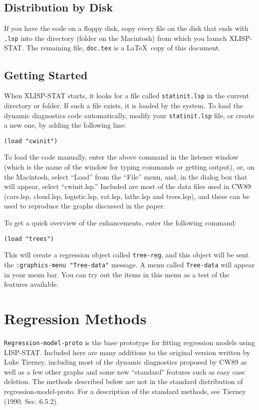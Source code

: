 \subsection{Distribution by Disk}
If you have the code on a floppy disk, copy every file on the disk that ends
with {\tt .lsp} into the directory (folder on the Macintosh) from which you
launch XLISP-STAT.  The remaining file, {\tt doc.tex}
is a \LaTeX\ copy of this document.

\subsection{Getting Started}
When XLISP-STAT starts, it looks for a file called {\tt statinit.lsp} in the
current directory or folder.  If such a file exists, it is loaded by the
system.  To load the dynamic diagnostics code automatically, 
modify your {\tt statinit.lsp} file, or
create a new one, by adding the following line:
\begin{verbatim}
(load "cwinit")
\end{verbatim}
To load the code manually, enter the above command in the listener window
(which is the name of the window for typing commands or getting output), or,
on the Macintosh, select ``Load'' from the ``File'' menu, and, in the dialog
box that will appear, select ``cwinit.lsp.''
Included are most of the data files
used in CW89 (cars.lsp, cloud.lsp, logistic.lsp, rat.lsp, lathe.lsp and
trees.lsp), and these can be used to reproduce the graphs 
discussed in the paper.

To get a quick overview of the enhancements, enter the following command:
\begin{verbatim}
(load "trees")
\end{verbatim}
This will create a regression object called {\tt tree-reg}, and this object 
will be sent the 
{\tt :graphics-menu "Tree-data"} message.  
A menu called {\tt Tree-data} will appear in
your menu bar.  You can try out the items in this menu as a test of the
features available.

\section{Regression Methods}

	{\tt Regression-model-proto} is the base prototype for fitting 
regression models using LISP-STAT.  Included here are many additions to
the original version written by Luke Tierney, 
including most of the dynamic diagnostics proposed by CW89 
as well as a few other graphs and some new ``standard" features 
such as easy case 
deletion. The methods described below are not in the standard
distribution of regression-model-proto.  For a description of the standard
methods, see Tierney (1990. Sec. 6.5.2).

